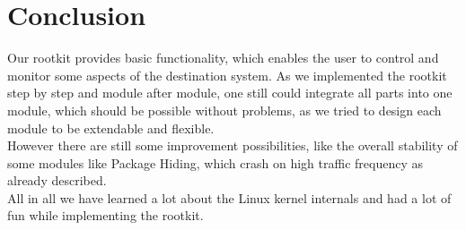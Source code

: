 \chapter{Conclusion}
Our rootkit provides basic functionality, which enables the user to control and monitor some aspects of the destination system. As we implemented the rootkit step by step and module after module, one still could integrate all parts into one module, which should be possible without problems, as we tried to design each module to be extendable and flexible.\\
However there are still some improvement possibilities, like the overall stability of some modules like Package Hiding, which crash on high traffic frequency as already described.\\
All in all we have learned a lot about the Linux kernel internals and had a lot of fun while implementing the rootkit.

